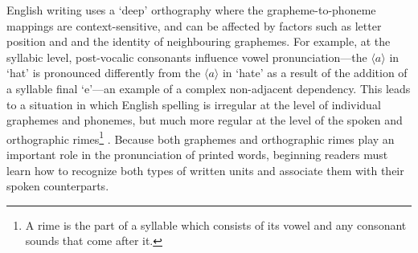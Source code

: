 \documentclass[review]{elsarticle}
\begin{document}
English writing uses a ‘deep’  orthography where the grapheme-to-phoneme mappings are  context-sensitive, and  can be affected by factors such as letter position and and the identity of neighbouring graphemes. For example, at the syllabic level, post-vocalic consonants influence vowel pronunciation---the $\langle a\rangle$ in `hat’ is pronounced differently from the  $\langle a\rangle$ in ‘hate’ as a result of the addition of a syllable final ‘e’---an example of a complex non-adjacent dependency. This leads to a situation in which English spelling is irregular at the level of individual graphemes and phonemes, but much more regular at the level of the spoken and orthographic rimes\footnote{A rime is the part of a syllable which consists of its vowel and any consonant sounds that come after it.} \citep{treimanSpecialRoleRimes1995}. Because both graphemes and orthographic rimes play an important role in the pronunciation of printed words, beginning readers must learn how to recognize both types of written units and associate them with their spoken counterparts. %

\end{document}
